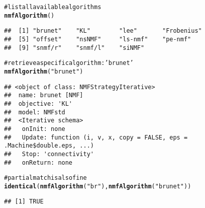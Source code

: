 \documentclass[a4paper]{article}\usepackage{graphicx, color}
\makeatletter
\newcommand{\hlfunctioncall}[1]{\textcolor[rgb]{0.501960784313725,0,0.329411764705882}{\textbf{#1}}}%
\newcommand{\hlstring}[1]{\textcolor[rgb]{0.6,0.6,1}{#1}}%
\newcommand{\hlcomment}[1]{\textcolor[rgb]{0.180392156862745,0.6,0.341176470588235}{#1}}%
\newenvironment{kframe}{%
 \def\at@end@of@kframe{}%
 \ifinner\ifhmode%
  \def\at@end@of@kframe{\end{minipage}}%
  \begin{minipage}{\columnwidth}%
 \fi\fi%
 \def\FrameCommand##1{\hskip\@totalleftmargin \hskip-\fboxsep
 \colorbox{shadecolor}{##1}\hskip-\fboxsep
     \hskip-\linewidth \hskip-\@totalleftmargin \hskip\columnwidth}%
 \MakeFramed {\advance\hsize-\width
   \@totalleftmargin\z@ \linewidth\hsize
   \@setminipage}}%
 {\par\unskip\endMakeFramed%
 \at@end@of@kframe}
\newenvironment{knitrout}{}{} %
\makeatother
\begin{document}
\begin{knitrout}
\color{fgcolor}\begin{kframe}
\begin{alltt}
\hlcomment{# list all available algorithms}
\hlfunctioncall{nmfAlgorithm}()
\end{alltt}
\begin{verbatim}
##  [1] "brunet"    "KL"        "lee"       "Frobenius"
##  [5] "offset"    "nsNMF"     "ls-nmf"    "pe-nmf"   
##  [9] "snmf/r"    "snmf/l"    "siNMF"
\end{verbatim}
\begin{alltt}
\hlcomment{# retrieve a specific algorithm: 'brunet'}
\hlfunctioncall{nmfAlgorithm}(\hlstring{"brunet"})
\end{alltt}
\begin{verbatim}
## <object of class: NMFStrategyIterative>
##  name: brunet [NMF]
##  objective: 'KL' 
##  model: NMFstd 
##  <Iterative schema>
##   onInit: none
##   Update: function (i, v, x, copy = FALSE, eps = .Machine$double.eps, ...)
##   Stop: 'connectivity'
##   onReturn: none
\end{verbatim}
\begin{alltt}
\hlcomment{# partial match is also fine}
\hlfunctioncall{identical}(\hlfunctioncall{nmfAlgorithm}(\hlstring{"br"}), \hlfunctioncall{nmfAlgorithm}(\hlstring{"brunet"}))
\end{alltt}
\begin{verbatim}
## [1] TRUE
\end{verbatim}
\end{kframe}
\end{knitrout}
\end{document}
